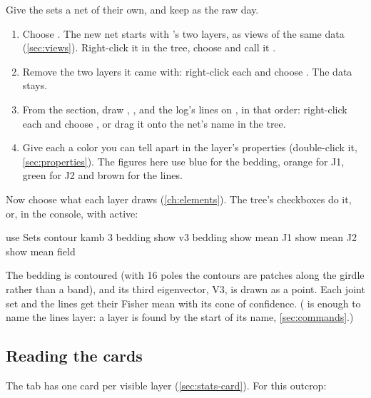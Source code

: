 Give the sets a net of their own, and keep  as the raw day.

\begin{enumerate}
\item Choose . The new net starts with 's two layers, as views of the
same data (\cref{sec:views}). Right-click it in the tree, choose  and call it .
\item Remove the two layers it came with: right-click each and choose .
The data stays.
\item From the  section, draw , ,  and the log's lines on
, in that order: right-click each and choose , or drag it onto the net's
name in the tree.
\item Give each a color you can tell apart in the layer's properties (double-click it,
\cref{sec:properties}). The figures here use blue for the bedding, orange for J1, green for J2 and brown
for the lines.
\end{enumerate}

Now choose what each layer draws (\cref{ch:elements}). The tree's checkboxes do it, or, in the console,
with  active:

\begin{codeblock}
use Sets
contour kamb 3 bedding
show v3 bedding
show mean J1
show mean J2
show mean field
\end{codeblock}

The bedding is contoured (with 16 poles the contours are patches along the girdle rather than a band),
and its third eigenvector, V3, is drawn as a point. Each joint set and the lines get their Fisher mean
with its cone of confidence. ( is enough to name the lines layer: a layer is found by the
start of its name, \cref{sec:commands}.)


\subsection{Reading the cards}

The  tab has one card per visible layer (\cref{sec:stats-card}). For this outcrop:

